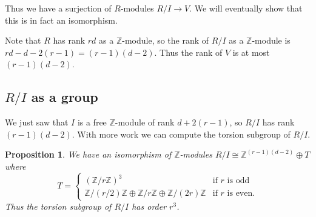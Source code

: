 \documentclass[reqno]{amsart}
\newtheorem{prop}[thm]{Proposition}
\theoremstyle{definition}
\theoremstyle{remark}
\def\Z{\mathbb{Z}}
\begin{document}
Thus we have a surjection of $R$-modules $R/I\to V$.  We will
eventually show that this is in fact an isomorphism.

Note that $R$ has rank $rd$ as a $\Z$-module, so the rank of $R/I$ as
a $\Z$-module is $rd-d-2(r-1)=(r-1)(d-2)$.  Thus the rank of $V$ is at
most $(r-1)(d-2)$.  

\subsection{$R/I$ as a group}
We just saw that $I$ is a free $\Z$-module of rank $d+2(r-1)$, so
$R/I$ has rank $(r-1)(d-2)$.  With more work we can compute the torsion
subgroup of $R/I$.

\begin{prop}\label{prop:R/I-as-group}
We have an isomorphism of $\Z$-modules $R/I\cong \Z^{(r-1)(d-2)}\oplus
T$ where
$$T=\begin{cases}
(\Z/r\Z)^3&\text{if $r$ is odd}\\
\Z/(r/2)\Z\oplus\Z/r\Z\oplus\Z/(2r)\Z&\text{if $r$ is even.}
\end{cases}$$
Thus the torsion subgroup of $R/I$ has order $r^3$.
\end{prop}
\end{document}
